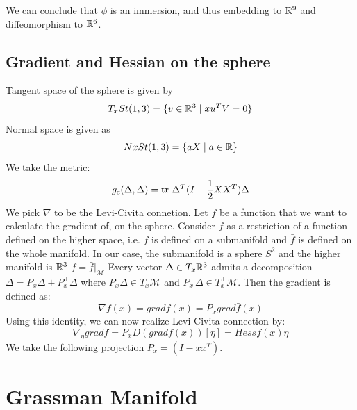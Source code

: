 \documentclass[11pt,a4paper]{report}
\begin{document}
\noindent We can conclude that $\phi$ is an immersion, and thus embedding to $\mathbb{R}^9$ and diffeomorphism to $\mathbb{R}^6$.

\section{Gradient and Hessian on the sphere}

Tangent space of the sphere is given by 
$$ T_x St(1,3) = \{ v \in \mathbb{R}^3 \; | \; xu^T V = 0 \} $$
Normal space is given as
$$ NxSt(1,3) = \{ a X \; | \; a \in \mathbb{R} \} $$
We take the metric:
$$ g_c(\Delta,\Delta) = \textrm{tr } \Delta^T (I - \frac{1}{2} X X^T ) \Delta  $$
We pick $\nabla$ to be the Levi-Civita connetion.
\newline
Let $f$ be a function that we want to calculate the gradient of, on the sphere.
Consider $f$ as a restriction of a function defined on the higher space, i.e. $f$ is defined on a submanifold and $\bar{f}$ is defined on the whole manifold.
In our case, the submanifold is a sphere $S^2$ and the higher manifold is $\mathbb{R}^3$
$f = \bar{f}|_{\mathcal{M}}$
Every vector $\Delta \in T_x \mathbb{R}^3$ admits a decomposition $\Delta = P_{x}\Delta + P_{x}^{\perp} \Delta$ where 
$ P_x \Delta \in T_{x} \mathcal{M} $ and $P_{x}^{\perp} \Delta \in T_{x}^{\perp} \mathcal{M}$.
Then the gradient is defined as:
$$\nabla f (x) =  grad f(x) = P_{x} grad \bar{f} (x) $$
Using this identity, we can now realize Levi-Civita connection by:
$$ \nabla_{\eta} grad f = P_{x} D (grad f(x))[\eta] = Hess f(x) \eta $$
We take the following projection $P_x = (I - xx^T)$.
\chapter{Grassman Manifold}\label{GrassChapter}
\end{document}
